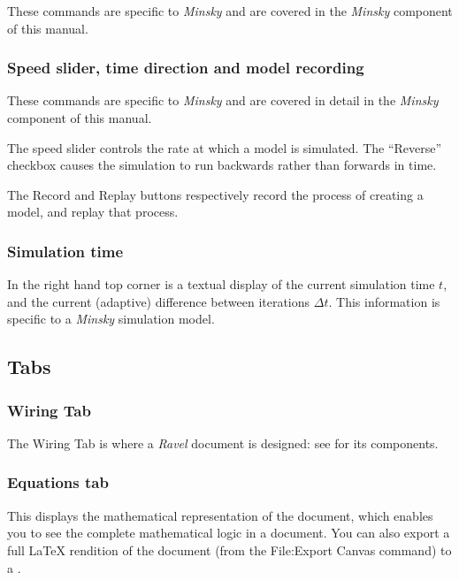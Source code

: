 These commands are specific to \emph{Minsky} and are covered in the
\emph{Minsky} component of this manual.

\subsubsection{Speed slider, time direction and model recording}

These commands are specific to \emph{Minsky} and are covered in detail
in the \emph{Minsky} component of this manual.

The speed slider controls the rate at which a model is simulated.
The ``Reverse'' checkbox causes the simulation to run backwards
rather than forwards in time. 

The Record and Replay buttons respectively record the process of creating
a model, and replay that process. 

\subsubsection{Simulation time}

In the right hand top corner is a textual display of the current simulation
time $t$, and the current (adaptive) difference between iterations
$\Delta t$. This information is specific to a \emph{Minsky} simulation
model.

\subsection{Tabs}

\subsubsection{Wiring Tab}

\label{tabs:wiring}

The Wiring Tab is where a \emph{Ravel} document is designed: see
for its components.

\subsubsection{Equations tab}

\label{tabs:Equations}

This displays the mathematical representation of the document, which
enables you to see the complete mathematical logic in a document.
You can also export a full \LaTeX{} rendition of the document (from the
File:Export Canvas command) to a .

